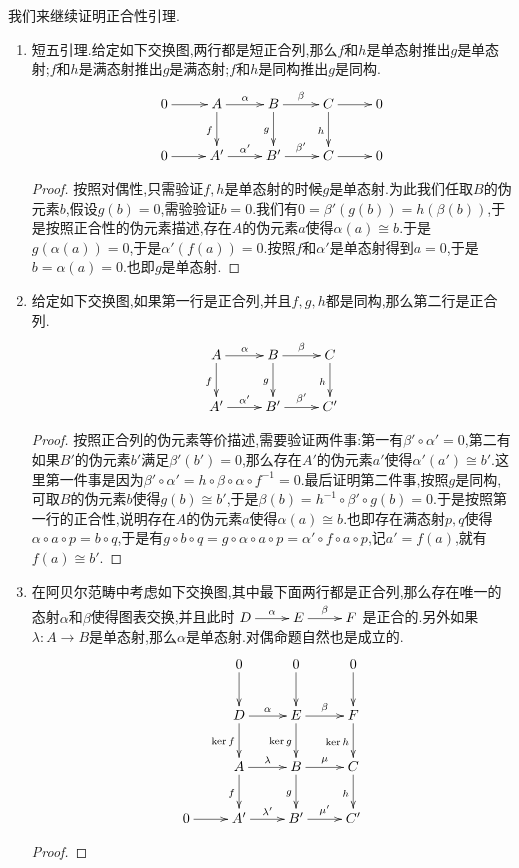 我们来继续证明正合性引理.
\begin{enumerate}
	\item 短五引理.给定如下交换图,两行都是短正合列,那么$f$和$h$是单态射推出$g$是单态射;$f$和$h$是满态射推出$g$是满态射;$f$和$h$是同构推出$g$是同构.
	$$\xymatrix{0\ar[r]&A\ar[r]^{\alpha}\ar[d]_f&B\ar[r]^{\beta}\ar[d]_g&C\ar[r]\ar[d]_h&0\\0\ar[r]&A'\ar[r]^{\alpha'}&B'\ar[r]^{\beta'}&C\ar[r]&0}$$
	\begin{proof}
		
		按照对偶性,只需验证$f,h$是单态射的时候$g$是单态射.为此我们任取$B$的伪元素$b$,假设$g(b)=0$,需验验证$b=0$.我们有$0=\beta'(g(b))=h(\beta(b))$,于是按照正合性的伪元素描述,存在$A$的伪元素$a$使得$\alpha(a)\cong b$.于是$g(\alpha(a))=0$,于是$\alpha'(f(a))=0$.按照$f$和$\alpha'$是单态射得到$a=0$,于是$b=\alpha(a)=0$.也即$g$是单态射.
	\end{proof}
    \item 给定如下交换图,如果第一行是正合列,并且$f,g,h$都是同构,那么第二行是正合列.
    $$\xymatrix{A\ar[r]^{\alpha}\ar[d]_f&B\ar[r]^{\beta}\ar[d]_g&C\ar[d]_h\\A'\ar[r]^{\alpha'}&B'\ar[r]^{\beta'}&C'}$$
    \begin{proof}
    	
    	按照正合列的伪元素等价描述,需要验证两件事:第一有$\beta'\circ\alpha'=0$,第二有如果$B'$的伪元素$b'$满足$\beta'(b')=0$,那么存在$A'$的伪元素$a'$使得$\alpha'(a')\cong b'$.这里第一件事是因为$\beta'\circ\alpha'=h\circ\beta\circ\alpha\circ f^{-1}=0$.最后证明第二件事,按照$g$是同构,可取$B$的伪元素$b$使得$g(b)\cong b'$,于是$\beta(b)=h^{-1}\circ \beta'\circ g(b)=0$.于是按照第一行的正合性,说明存在$A$的伪元素$a$使得$\alpha(a)\cong b$.也即存在满态射$p,q$使得$\alpha\circ a\circ p=b\circ q$,于是有$g\circ b\circ q=g\circ\alpha\circ a\circ p=\alpha'\circ f\circ a\circ p$,记$a'=f(a)$,就有$f(a)\cong b'$.
    \end{proof}
    \item 在阿贝尔范畴中考虑如下交换图,其中最下面两行都是正合列,那么存在唯一的态射$\alpha$和$\beta$使得图表交换,并且此时$\xymatrix{D\ar[r]^{\alpha}&E\ar[r]^{\beta}&F}$是正合的.另外如果$\lambda:A\to B$是单态射,那么$\alpha$是单态射.对偶命题自然也是成立的.
    $$\xymatrix{&0\ar[d]&0\ar[d]&0\ar[d]\\&D\ar[r]^{\alpha}\ar[d]_{\ker f}&E\ar[r]^{\beta}\ar[d]_{\ker g}&F\ar[d]_{\ker h}\\&A\ar[r]^{\lambda}\ar[d]_f&B\ar[r]^{\mu}\ar[d]_g&C\ar[d]_h\\0\ar[r]&A'\ar[r]^{\lambda'}&B'\ar[r]^{\mu'}&C'}$$
    \begin{proof}
    	

\end{proof}
\end{enumerate}
